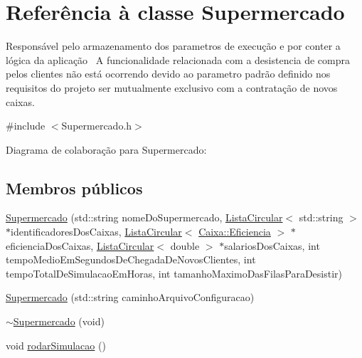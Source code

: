 \hypertarget{a00005}{\section{Referência à classe Supermercado}
\label{a00005}
}


Responsável pelo armazenamento dos parametros de execução e por conter a lógica da aplicação~\newline
 A funcionalidade relacionada com a desistencia de compra pelos clientes não está ocorrendo devido ao parametro padrão definido nos requisitos do projeto ser mutualmente exclusivo com a contratação de novos caixas.  




{\ttfamily \#include $<$Supermercado.\+h$>$}



Diagrama de colaboração para Supermercado\+:
\subsection*{Membros públicos}
\begin{DoxyCompactItemize}
\item 
\hyperlink{a00005_a51e46aa12924a52dbf0e4f26ad3bd7b3}{Supermercado} (std\+::string nome\+Do\+Supermercado, \hyperlink{a00004}{Lista\+Circular}$<$ std\+::string $>$ $\ast$identificadores\+Dos\+Caixas, \hyperlink{a00004}{Lista\+Circular}$<$ \hyperlink{a00001_a0e98d0cd8dc2ff4f73d637d73f7bbe85}{Caixa\+::\+Eficiencia} $>$ $\ast$eficiencia\+Dos\+Caixas, \hyperlink{a00004}{Lista\+Circular}$<$ double $>$ $\ast$salarios\+Dos\+Caixas, int tempo\+Medio\+Em\+Segundos\+De\+Chegada\+De\+Novos\+Clientes, int tempo\+Total\+De\+Simulacao\+Em\+Horas, int tamanho\+Maximo\+Das\+Filas\+Para\+Desistir)
\item 
\hyperlink{a00005_a3f0598a98bd6179c4553eb213c4aa48c}{Supermercado} (std\+::string caminho\+Arquivo\+Configuracao)
\item 
\hyperlink{a00005_ab21737ada65202c6293a503bfa64e8a0}{$\sim$\+Supermercado} (void)
\item 
void \hyperlink{a00005_a2244eb3e925e1e5e78a0d152bbaa78a9}{rodar\+Simulacao} ()
\end{DoxyCompactItemize}


